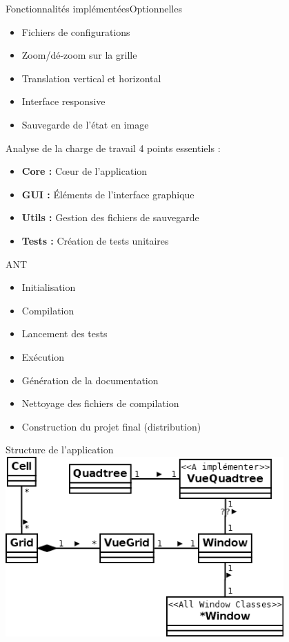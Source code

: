 \documentclass{beamer}
\begin{document}
	\begin{frame}{Fonctionnalités implémentées}{Optionnelles}
		\begin{itemize}
			\item Fichiers de configurations
			\item Zoom/dé-zoom sur la grille
			\item Translation vertical et horizontal
			\item Interface responsive
			\item Sauvegarde de l'état en image		
		\end{itemize}
	\end{frame}

	\begin{frame}{Analyse de la charge de travail}
	    4 points essentiels : 	
		\begin{itemize}
			\item \textbf{Core : }C\oe ur de l'application
			\item \textbf{GUI : }Éléments de l'interface graphique
			\item\textbf{Utils : }Gestion des fichiers de sauvegarde
			\item \textbf{Tests : }Création de tests unitaires
		\end{itemize}
	\end{frame}

	\begin{frame}{ANT}
		\begin{itemize}
			\item Initialisation
			\item Compilation
			\item Lancement des tests
			\item Exécution 
			\item Génération de la documentation
			\item Nettoyage des fichiers de compilation
			\item Construction du projet final (distribution)
		\end{itemize}
	\end{frame}

	\begin{frame}{Structure de l'application}
		\includegraphics[width=0.8\textwidth]{image/diagramme.png}
	\end{frame}
\end{document}
